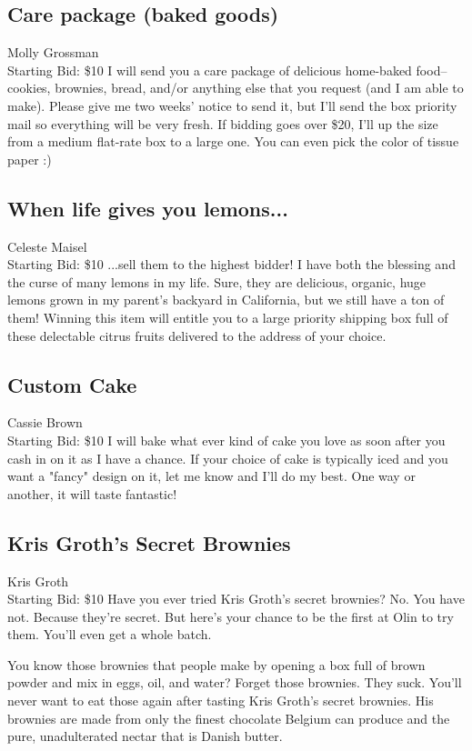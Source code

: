 \documentclass[11pt]{article}
\begin{document}
\subsection{Care package (baked goods)}
Molly Grossman
\\
Starting Bid: \$10
\newline
I will send you a care package of delicious home-baked food--cookies, brownies, bread, and/or anything else that you request (and I am able to make). Please give me two weeks' notice to send it, but I'll send the box priority mail so everything will be very fresh. If bidding goes over \$20, I'll up the size from a medium flat-rate box to a large one. You can even pick the color of tissue paper :)
\subsection{When life gives you lemons...}
Celeste Maisel
\\
Starting Bid: \$10
\newline
...sell them to the highest bidder!
I have both the blessing and the curse of many lemons in my life.  Sure, they are delicious, organic, huge lemons grown in my parent's backyard in California, but we still have a ton of them!  Winning this item will entitle you to a large priority shipping box full of these delectable citrus fruits delivered to the address of your choice.
\subsection{Custom Cake}
Cassie Brown
\\
Starting Bid: \$10
\newline
I will bake what ever kind of cake you love as soon after you cash in on it as I have a chance. If your choice of cake is typically iced and you want a "fancy" design on it, let me know and I'll do my best. One way or another, it will taste fantastic!
\subsection{Kris Groth's Secret Brownies}
Kris Groth
\\
Starting Bid: \$10
\newline
Have you ever tried Kris Groth's secret brownies? No. You have not. Because they're secret. But here's your chance to be the first at Olin to try them. You'll even get a whole batch. 

You know those brownies that people make by opening a box full of brown powder and mix in eggs, oil, and water? Forget those brownies. They suck. You'll never want to eat those again after tasting Kris Groth's secret brownies. His brownies are made from only the finest chocolate Belgium can produce and the pure, unadulterated nectar that is Danish butter.
\end{document}
